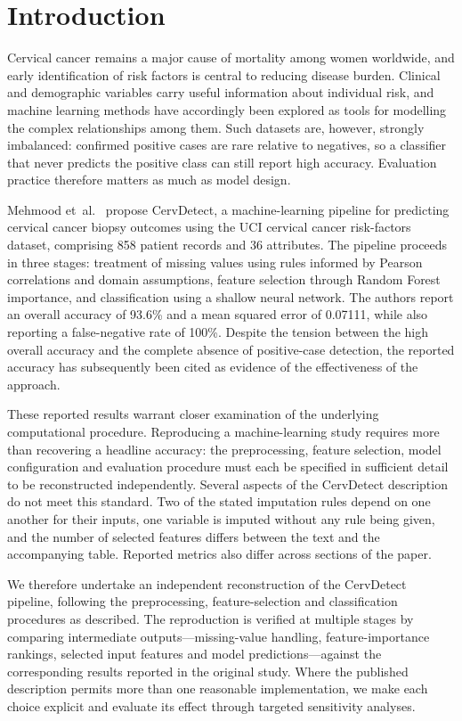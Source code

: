 \section{Introduction}\label{sec:intro}

Cervical cancer remains a major cause of mortality among women worldwide, and
early identification of risk factors is central to reducing disease burden.
Clinical and demographic variables carry useful information about individual
risk, and machine learning methods have accordingly been explored as tools for
modelling the complex relationships among them. Such datasets are, however,
strongly imbalanced: confirmed positive cases are rare relative to negatives,
so a classifier that never predicts the positive class can still report high
accuracy. Evaluation practice therefore matters as much as model design.

Mehmood et~al.~\cite{mehmood2021} propose CervDetect, a machine-learning
pipeline for predicting cervical cancer biopsy outcomes using the UCI cervical
cancer risk-factors dataset, comprising 858 patient records and 36 attributes.
The pipeline proceeds in three stages: treatment of missing values using rules
informed by Pearson correlations and domain assumptions, feature selection
through Random Forest importance, and classification using a shallow neural
network. The authors report an overall accuracy of 93.6\% and a mean squared
error of 0.07111, while also reporting a false-negative rate of 100\%. Despite
the tension between the high overall accuracy and the complete absence of
positive-case detection, the reported accuracy has subsequently been cited as
evidence of the effectiveness of the approach.

These reported results warrant closer examination of the underlying
computational procedure. Reproducing a machine-learning study requires more
than recovering a headline accuracy: the preprocessing, feature selection,
model configuration and evaluation procedure must each be specified in
sufficient detail to be reconstructed independently. Several aspects of the
CervDetect description do not meet this standard. Two of the stated imputation
rules depend on one another for their inputs, one variable is imputed without
any rule being given, and the number of selected features differs between the
text and the accompanying table. Reported metrics also differ across sections
of the paper.

We therefore undertake an independent reconstruction of the CervDetect
pipeline, following the preprocessing, feature-selection and classification
procedures as described. The reproduction is verified at multiple stages by
comparing intermediate outputs---missing-value handling, feature-importance
rankings, selected input features and model predictions---against the
corresponding results reported in the original study. Where the published
description permits more than one reasonable implementation, we make each
choice explicit and evaluate its effect through targeted sensitivity analyses.


